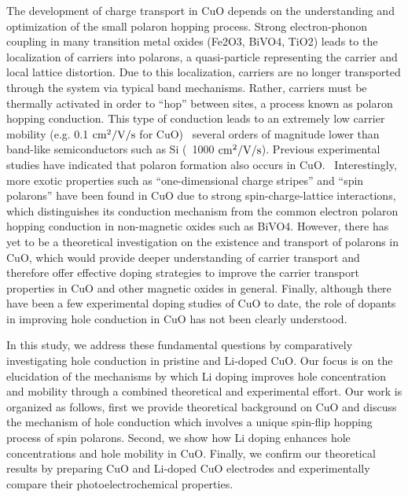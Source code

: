 The development of charge transport in CuO depends on the understanding and optimization of the small polaron hopping process. Strong electron-phonon coupling in many transition metal oxides (Fe2O3, BiVO4, TiO2) leads to the localization of carriers into polarons, a quasi-particle representing the carrier and local lattice distortion.\cite{rettie2016unravelling,rettie2013combined,carneiro2017excitation}
Due to this localization, carriers are no longer transported through the system via typical band mechanisms. Rather, carriers must be thermally activated in order to “hop” between sites, a process known as polaron hopping conduction.\cite{devreese1996polarons,mott1968conduction}
This type of conduction leads to an extremely low carrier mobility (e.g. 0.1 $\rm cm^2/V/s$ for CuO)~\cite{rettie2016unravelling} several orders of magnitude lower than band-like semiconductors such as Si (~1000 $\rm cm^2/V/s$). Previous experimental studies have indicated that polaron formation also occurs in CuO.~\cite{samokhvalov1993low,wu2014charge,zheng2001evidence,jeong1996nonstoichiometry,zheng2004fast}
Interestingly, more exotic properties such as ``one-dimensional charge stripes'' and ``spin polarons'' have been found in CuO due to strong spin-charge-lattice interactions,\cite{zheng2001evidence} which distinguishes its conduction mechanism from the common electron polaron hopping conduction in non-magnetic oxides such as BiVO4.  However, there has yet to be a theoretical investigation on the existence and transport of polarons in CuO, which would provide deeper understanding of carrier transport and therefore offer effective doping strategies to improve the carrier transport properties in CuO and other magnetic oxides in general.
Finally, although there have been a few experimental doping studies of CuO to date,\cite{masudy2015titanium,zheng2004fast,choi2017p,gao2007ferromagnetic,masudy2015optical,zheng2003effect,chiang2016dopant,chiang2011li,chand2014structural} the role of dopants in improving hole conduction in CuO has not been clearly understood.

In this study, we address these fundamental questions by comparatively investigating hole conduction in pristine and Li-doped CuO. Our focus is on the elucidation of the mechanisms by which Li doping improves hole concentration and mobility through a combined theoretical and experimental effort. Our work is organized as follows, first we provide theoretical background on CuO and discuss the mechanism of hole conduction which involves a unique spin-flip hopping process of spin polarons. Second, we show how Li doping enhances hole concentrations and hole mobility in CuO. Finally, we confirm our theoretical results by preparing CuO and Li-doped CuO electrodes and experimentally compare their photoelectrochemical properties.

